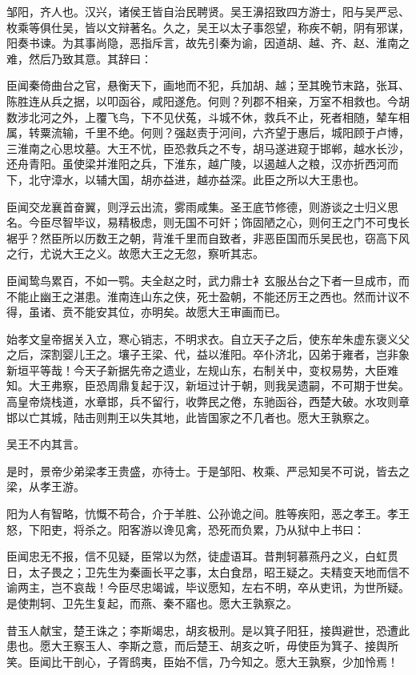 \documentclass[]{article}
\begin{document}
邹阳，齐人也。汉兴，诸侯王皆自治民聘贤。吴王濞招致四方游士，阳与吴严忌、枚乘等俱仕吴，皆以文辩著名。久之，吴王以太子事怨望，称疾不朝，阴有邪谋，阳奏书谏。为其事尚隐，恶指斥言，故先引秦为谕，因道胡、越、齐、赵、淮南之难，然后乃致其意。其辞曰：

臣闻秦倚曲台之官，悬衡天下，画地而不犯，兵加胡、越；至其晚节末路，张耳、陈胜连从兵之据，以叩函谷，咸阳遂危。何则？列郡不相亲，万室不相救也。今胡数涉北河之外，上覆飞鸟，下不见伏菟，斗城不休，救兵不止，死者相随，辇车相属，转粟流输，千里不绝。何则？强赵责于河间，六齐望于惠后，城阳顾于卢博，三淮南之心思坟墓。大王不忧，臣恐救兵之不专，胡马遂进窥于邯郸，越水长沙，还舟青阳。虽使梁并淮阳之兵，下淮东，越广陵，以遏越人之粮，汉亦折西河而下，北守漳水，以辅大国，胡亦益进，越亦益深。此臣之所以大王患也。

臣闻交龙襄首奋翼，则浮云出流，雾雨咸集。圣王底节修德，则游谈之士归义思名。今臣尽智毕议，易精极虑，则无国不可奸；饰固陋之心，则何王之门不可曳长裾乎？然臣所以历数王之朝，背淮千里而自致者，非恶臣国而乐吴民也，窃高下风之行，尤说大王之义。故愿大王之无忽，察听其志。

臣闻鸷鸟累百，不如一鹗。夫全赵之时，武力鼎士衤玄服丛台之下者一旦成市，而不能止幽王之湛患。淮南连山东之侠，死士盈朝，不能还厉王之西也。然而计议不得，虽诸、贲不能安其位，亦明矣。故愿大王审画而已。

始孝文皇帝据关入立，寒心销志，不明求衣。自立天子之后，使东牟朱虚东褒义父之后，深割婴儿王之。壤子王梁、代，益以淮阳。卒仆济北，囚弟于雍者，岂非象新垣平等哉！今天子新据先帝之遗业，左规山东，右制关中，变权易势，大臣难知。大王弗察，臣恐周鼎复起于汉，新垣过计于朝，则我吴遗嗣，不可期于世矣。高皇帝烧栈道，水章邯，兵不留行，收弊民之倦，东驰函谷，西楚大破。水攻则章邯以亡其城，陆击则荆王以失其地，此皆国家之不几者也。愿大王孰察之。

吴王不内其言。

是时，景帝少弟梁孝王贵盛，亦待士。于是邹阳、枚乘、严忌知吴不可说，皆去之梁，从孝王游。

阳为人有智略，忼慨不苟合，介于羊胜、公孙诡之间。胜等疾阳，恶之孝王。孝王怒，下阳吏，将杀之。阳客游以谗见禽，恐死而负累，乃从狱中上书曰：

臣闻忠无不报，信不见疑，臣常以为然，徒虚语耳。昔荆轲慕燕丹之义，白虹贯日，太子畏之；卫先生为秦画长平之事，太白食昂，昭王疑之。夫精变天地而信不谕两主，岂不哀哉！今臣尽忠竭诚，毕议愿知，左右不明，卒从吏讯，为世所疑。是使荆轲、卫先生复起，而燕、秦不寤也。愿大王孰察之。

昔玉人献宝，楚王诛之；李斯竭忠，胡亥极刑。是以箕子阳狂，接舆避世，恐遭此患也。愿大王察玉人、李斯之意，而后楚王、胡亥之听，毋使臣为箕子、接舆所笑。臣闻比干剖心，子胥鸱夷，臣始不信，乃今知之。愿大王孰察，少加怜焉！
\end{document}
